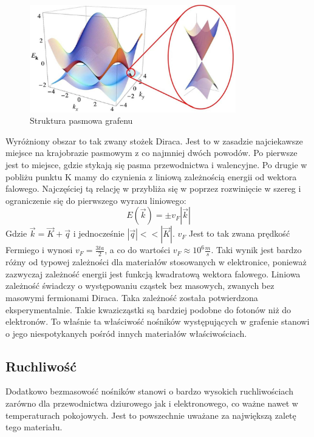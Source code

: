 	\begin{figure}[t]
	\centering
	\includegraphics[width=0.80\textwidth]{./Rozdzial_2/obrazki/Struktura_pasmowa.jpg}
	\caption{Struktura pasmowa grafenu}
	\label{fig:Struktura_pasmowa}
	\end{figure}

	Wyróżniony obszar to tak zwany stożek Diraca. Jest to w zasadzie najciekawsze miejsce na krajobrazie pasmowym z 
	co najmniej dwóch powodów. Po pierwsze jest to miejsce, gdzie stykają się pasma przewodnictwa i walencyjne. 
	Po drugie w pobliżu punktu K mamy do czynienia z liniową zależnością energii od wektora falowego. 
	Najczęściej tą relację w przybliża się w poprzez rozwinięcie w szereg i ograniczenie 
	się do pierwszego wyrazu liniowego:
	\begin{equation}
    		E(\vec k) = \pm v_F|\vec k|
		\label{equ:liniowa_dyspersja}
	\end{equation}
	Gdzie $\vec k = \vec K + \vec q$ i jednocześnie $|\vec q| << |\vec K|$. $v_F$ Jest to tak zwana prędkość Fermiego
	i wynosi $v_F = \frac{3ta}{2}$, a co do wartości $v_F \approx 10^6 \frac{m}{s}$. Taki wynik jest bardzo różny 
	od typowej zależności dla materiałów stosowanych w elektronice, ponieważ zazwyczaj zależność energii jest 
	funkcją kwadratową wektora falowego. 
	Liniowa zależność świadczy o występowaniu cząstek bez masowych, zwanych bez masowymi 
	fermionami Diraca. Taka zależność
	została potwierdzona eksperymentalnie. Takie kwazicząstki są bardziej podobne do fotonów niż do elektronów. 
	To właśnie ta właściwość nośników występujących w grafenie stanowi o jego niespotykanych pośród innych materiałów
	właściwościach.
	
	\subsection{Ruchliwość}
	Dodatkowo bezmasowość nośników stanowi o bardzo wysokich ruchliwościach zarówno dla przewodnictwa dziurowego 
	jak i elektronowego, co ważne nawet w temperaturach pokojowych. Jest to powszechnie uważane za największą
	zaletę tego materiału.

